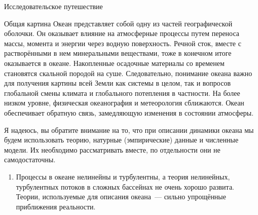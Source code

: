 \begin{chapter}{Исследовательское путешествие}
\begin{section}{Общая картина}
Океан представляет собой одну из частей географической оболочки. 
Он оказывает влияние на атмосферные процессы путем переноса массы, момента и
энергии через водную поверхность. Речной сток, вместе с растворёнными в нем
минеральными веществами, тоже в конечном итоге оказывается в океане. 
Накопленные осадочные материалы со временем становятся скальной
породой на суше. Следовательно, понимание океана важно для получения картины 
всей Земли как системы в целом, так и вопросов глобальной смены климата и
глобального потепления в частности. На более низком уровне, физическая 
океанография и метеорология сближаются. Океан обеспечивает обратную связь,
замедляющую изменения в состоянии атмосферы.
%

Я надеюсь, вы обратите внимание на то, что при описании динамики океана мы 
будем использовать теорию, натурные (эмпирические) данные и численные модели. 
Их необходимо рассматривать вместе, по отдельности они не самодостаточны.
%

\begin{enumerate}
\item
Процессы в океане нелинейны и турбулентны, а теория нелинейных, турбулентных 
потоков в сложных бассейнах не очень хорошо развита. Теории, используемые 
для описания океана~--- сильно упрощённые приближения реальности. 
%


\end{enumerate}
\end{section}
\end{chapter}
